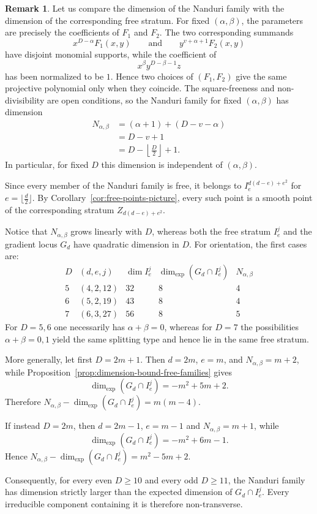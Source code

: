 \documentclass[11pt]{amsart} %
\theoremstyle{definition}
\newtheorem{Remark}[Theorem]{Remark}
\begin{document}
\begin{Remark}
Let us compare the dimension of the Nanduri family with the
dimension of the corresponding free stratum.  For fixed $(\alpha,\beta)$, the parameters are precisely the
coefficients of $F_1$ and $F_2$. The two corresponding summands
\[
x^{D-\alpha}F_1(x,y)
\qquad\text{and}\qquad
y^{v+\alpha+1}F_2(x,y)
\]
have disjoint monomial supports, while the coefficient of
\[
x^\beta y^{D-\beta-1}z
\]
has been normalized to be $1$. Hence two choices of $(F_1,F_2)$ give
the same projective polynomial only when they coincide. The
square-freeness and non-divisibility are open conditions, so
the Nanduri family for fixed $(\alpha,\beta)$ has dimension
\[
\begin{aligned}
N_{\alpha,\beta}
&=(\alpha+1)+(D-v-\alpha)\\
&=D-v+1\\
&=
D-\left\lfloor\frac D2\right\rfloor+1.
\end{aligned}
\]
In particular, for fixed $D$ this dimension is independent of
$(\alpha,\beta)$.

Since every member of the Nanduri family is free, it belongs to $
I_e^{d(d-e)+e^2}$ for $e=\lfloor\frac d2\rfloor$. By Corollary~\ref{cor:free-points-picture}, every such point is a
smooth point of the corresponding stratum $Z_{d(d-e)+e^2}$.

Notice that $N_{\alpha,\beta}$ grows linearly with $D$, whereas both
the free stratum $I_e^j$ and the gradient locus $G_d$ have quadratic
dimension in $D$. For orientation, the first cases are:
\[
\begin{array}{c|c|c|c|c}
D & (d,e,j)
& \dim I_e^j
& \dim_{\mathrm{exp}}(G_d\cap I_e^j)
& N_{\alpha,\beta}
\\ \hline
5 & (4,2,12) & 32 & 8 & 4\\
6 & (5,2,19) & 43 & 8 & 4\\
7 & (6,3,27) & 56 & 8 & 5
\end{array}
\]
For $D=5,6$ one necessarily has $\alpha+\beta=0$, whereas for
$D=7$ the possibilities $\alpha+\beta=0,1$ yield the same splitting
type and hence lie in the same free stratum.

More generally, let first \(D=2m+1\). Then
\(
d=2m\), \(e=m\), and \(N_{\alpha,\beta}=m+2\), while Proposition~\ref{prop:dimension-bound-free-families} gives
\[
\dim_{\mathrm{exp}}(G_d\cap I_e^j)
=
-m^2+5m+2.
\]
Therefore \(N_{\alpha,\beta}
-
\dim_{\mathrm{exp}}(G_d\cap I_e^j)
=
m(m-4)\).

If instead \(D=2m\), then \(
d=2m-1\), \(e=m-1\) and \(N_{\alpha,\beta}=m+1\), while
\[
\dim_{\mathrm{exp}}(G_d\cap I_e^j)
=
-m^2+6m-1.
\]
Hence \(N_{\alpha,\beta}
-
\dim_{\mathrm{exp}}(G_d\cap I_e^j)
=
m^2-5m+2\).

Consequently, for every even $D\geq10$ and every odd $D\geq11$, the Nanduri family has dimension strictly larger than the expected
dimension of $G_d\cap I_e^j$. Every irreducible component containing it is therefore non-transverse.
\end{Remark}
\end{document}
